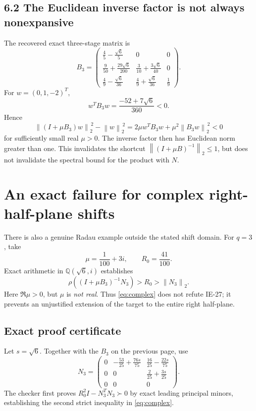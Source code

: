\documentclass[11pt,letterpaper]{article}
\newcommand{\norm}[1]{\left\|#1\right\|_2}
\begin{document}
\subsection*{6.2 The Euclidean inverse factor is not always nonexpansive}
The recovered exact three-stage matrix is
\[
 B_3=\begin{pmatrix}
 \frac45-\frac{\sqrt6}{5}&0&0\\
 \frac9{50}+\frac{29\sqrt6}{200}&\frac3{10}+\frac{3\sqrt6}{40}&0\\
 \frac49-\frac{\sqrt6}{36}&\frac49+\frac{\sqrt6}{36}&\frac19
 \end{pmatrix}.
\]
For $w=(0,1,-2)^T$,
\[
 w^TB_3w=\frac{-52+7\sqrt6}{360}<0.
\]
Hence
\[
 \norm{(I+\mu B_3)w}^{\,2}-\norm{w}^{\,2}
 =2\mu w^TB_3w+\mu^2\norm{B_3w}^{\,2}<0
\]
for sufficiently small real $\mu>0$. The inverse factor then has
Euclidean norm greater than one. This invalidates the shortcut
$\norm{(I+\mu B)^{-1}}\le1$, but does not invalidate the spectral bound
for the product with $N$.

\newpage
\section{An exact failure for complex right-half-plane shifts}
There is also a genuine Radau example outside the stated shift domain.
For $q=3$, take
\[
 \mu=\frac1{100}+3i,\qquad R_0=\frac{41}{100}.
\]
Exact arithmetic in $\mathbb Q(\sqrt6,i)$ establishes
\begin{equation}\label{eq:complex}
 \rho((I+\mu B_3)^{-1}N_3)>R_0>\norm{N_3}.
\end{equation}
Here $\Re\mu>0$, but $\mu$ is \emph{not real}. Thus
\eqref{eq:complex} does not refute IE-27; it prevents an unjustified
extension of the target to the entire right half-plane.

\subsection*{Exact proof certificate}
Let $s=\sqrt6$. Together with the $B_3$ on the previous page, use
\[
 N_3=\begin{pmatrix}
 0&-\frac{53}{25}+\frac{76s}{75}&\frac{16}{25}-\frac{22s}{75}\\
 0&0&\frac2{25}+\frac{3s}{25}\\
 0&0&0
 \end{pmatrix}.
\]
The checker first proves $R_0^2I-N_3^TN_3\succ0$ by exact leading
principal minors, establishing the second strict inequality in
\eqref{eq:complex}.
\end{document}
